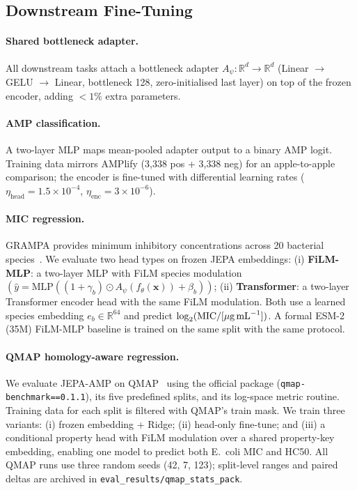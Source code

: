 \subsection{Downstream Fine-Tuning}
\label{sec:finetune}

\paragraph{Shared bottleneck adapter.}
All downstream tasks attach a bottleneck adapter
$A_\psi: \mathbb{R}^d \to \mathbb{R}^d$
(Linear $\to$ GELU $\to$ Linear, bottleneck 128, zero-initialised last layer)
on top of the frozen encoder, adding $<1\%$ extra parameters.

\paragraph{AMP classification.}
A two-layer MLP maps mean-pooled adapter output to a binary AMP logit.
Training data mirrors AMPlify (3{,}338 pos + 3{,}338 neg) for
an apple-to-apple comparison; the encoder is fine-tuned with
differential learning rates ($\eta_\text{head} = 1.5\times10^{-4}$,
$\eta_\text{enc} = 3\times10^{-6}$).

\paragraph{MIC regression.}
GRAMPA provides minimum inhibitory concentrations across 20 bacterial
species~\citep{grampa}.
We evaluate two head types on frozen JEPA embeddings:
(i) \textbf{FiLM-MLP}: a two-layer MLP with FiLM species modulation
$(\hat{y} = \text{MLP}((1{+}\gamma_b)\odot A_\psi(f_\theta(\mathbf{x}))+\beta_b))$;
(ii) \textbf{Transformer}: a two-layer Transformer encoder head
with the same FiLM modulation.
Both use a learned species embedding $e_b \in \mathbb{R}^{64}$ and predict
$\log_2(\text{MIC}/[\mu\text{g\,mL}^{-1}])$.
A formal ESM-2 (35M) FiLM-MLP baseline is trained on the same split with the
same protocol.

\paragraph{QMAP homology-aware regression.}
We evaluate JEPA-AMP on QMAP~\citep{qmap2026} using the official package
(\texttt{qmap-benchmark==0.1.1}), its five predefined splits, and its
log-space metric routine.
Training data for each split is filtered with QMAP's train mask.
We train three variants: (i) frozen embedding + Ridge; (ii) head-only
fine-tune; and (iii) a conditional property head with FiLM modulation over
a shared property-key embedding, enabling one model to predict both
E.~coli MIC and HC50.
All QMAP runs use three random seeds (42, 7, 123); split-level ranges and
paired deltas are archived in \texttt{eval\_results/qmap\_stats\_pack}.
